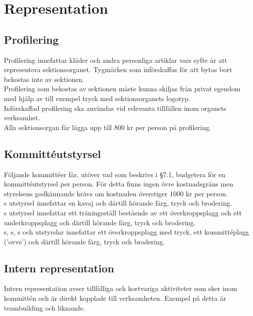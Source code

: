 \documentclass[11pt, includeaddress]{classes/cthit}
\begin{document}
\section{Representation}

\subsection{Profilering}
Profilering innefattar kläder och andra personliga artiklar vars syfte är att representera sektionsorganet. Tygmärken som införskaffas för att bytas bort bekostas inte av sektionen. \\

Profilering som bekostas av sektionen måste kunna skiljas från privat egendom
med hjälp av till exempel tryck med sektionsorganets logotyp. \\

Införskaffad profilering ska användas vid relevanta tillfällen inom organets verksamhet. \\

Alla sektionsorgan får lägga upp till 800 kr per person på profilering.

\subsection{Kommittéutstyrsel}
Följande kommittéer får, utöver vad som beskrivs i §7.1, budgetera för en kommittéutstyrsel per person. För detta finns ingen övre kostnadsgräns men styrelsens godkännande krävs om kostnaden överstiger 1000 kr per person. \\

\ARMIT{}s utstyrsel innefattar en kavaj och därtill hörande färg, tryck och brodering. \\

\FRITID{}s utstyrsel innefattar ett träningsställ bestående av ett överkroppsplagg och ett underkroppsplagg och därtill hörande färg, tryck och brodering. \\

\FLASHIT{}s, \NOLLKIT{}s, \PRIT{}s och \SEXITs utstyrslar innefattar ett överkroppsplagg med tryck, ett kommittéplagg (’ovve’) och därtill hörande färg, tryck och brodering.

\subsection{Intern representation}
Intern representation avser tillfälliga och kortvariga aktiviteter som sker inom kommittén och är direkt kopplade till verksamheten. Exempel på detta är teambuilding och liknande. \\
\end{document}
